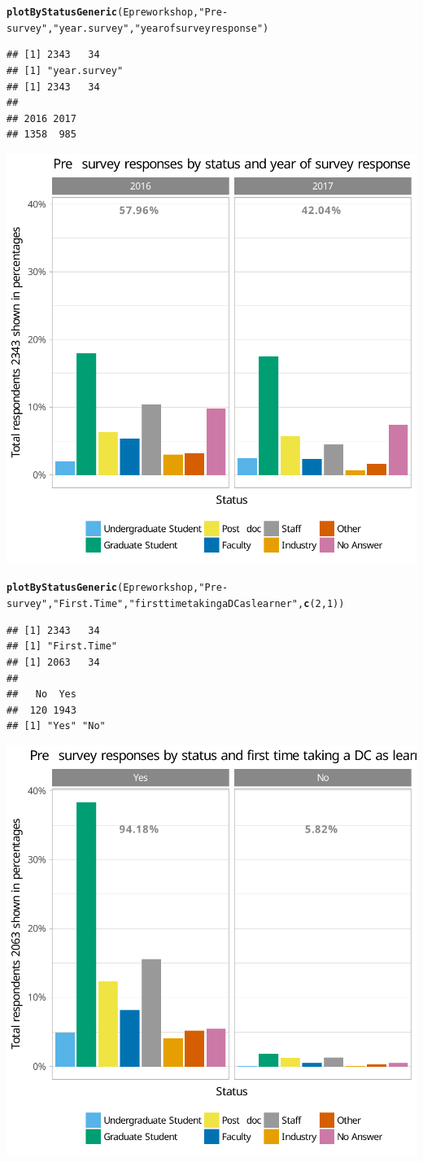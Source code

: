 \documentclass{article}\usepackage[]{graphicx}\usepackage[]{color}
\makeatletter
\newcommand{\hlnum}[1]{\textcolor[rgb]{0.686,0.059,0.569}{#1}}%
\newcommand{\hlstr}[1]{\textcolor[rgb]{0.192,0.494,0.8}{#1}}%
\newcommand{\hlstd}[1]{\textcolor[rgb]{0.345,0.345,0.345}{#1}}%
\newcommand{\hlkwd}[1]{\textcolor[rgb]{0.737,0.353,0.396}{\textbf{#1}}}%
\newenvironment{kframe}{%
 \def\at@end@of@kframe{}%
 \ifinner\ifhmode%
  \def\at@end@of@kframe{\end{minipage}}%
  \begin{minipage}{\columnwidth}%
 \fi\fi%
 \def\FrameCommand##1{\hskip\@totalleftmargin \hskip-\fboxsep
 \colorbox{shadecolor}{##1}\hskip-\fboxsep
     \hskip-\linewidth \hskip-\@totalleftmargin \hskip\columnwidth}%
 \MakeFramed {\advance\hsize-\width
   \@totalleftmargin\z@ \linewidth\hsize
   \@setminipage}}%
 {\par\unskip\endMakeFramed%
 \at@end@of@kframe}
\newenvironment{knitrout}{}{} %
\makeatother
\begin{document}
\begin{knitrout}
\color{fgcolor}\begin{kframe}
\begin{alltt}
\hlkwd{plotByStatusGeneric}\hlstd{(Epreworkshop,} \hlstr{"Pre-survey"}\hlstd{,} \hlstr{"year.survey"} \hlstd{,} \hlstr{"year of survey response"}\hlstd{)}
\end{alltt}
\begin{verbatim}
## [1] 2343   34
## [1] "year.survey"
## [1] 2343   34
## 
## 2016 2017 
## 1358  985
\end{verbatim}
\end{kframe}

{\centering \includegraphics[width=.6\linewidth]{figure/calls-Rnwplotting-presurvey-data-1} 

}


\begin{kframe}\begin{alltt}
\hlkwd{plotByStatusGeneric}\hlstd{(Epreworkshop,} \hlstr{"Pre-survey"}\hlstd{,} \hlstr{"First.Time"} \hlstd{,} \hlstr{"first time taking a DC as learner"}\hlstd{,} \hlkwd{c}\hlstd{(}\hlnum{2}\hlstd{,}\hlnum{1}\hlstd{))}
\end{alltt}
\begin{verbatim}
## [1] 2343   34
## [1] "First.Time"
## [1] 2063   34
## 
##   No  Yes 
##  120 1943 
## [1] "Yes" "No"
\end{verbatim}
\end{kframe}

{\centering \includegraphics[width=.6\linewidth]{figure/calls-Rnwplotting-presurvey-data-2} 

}
\end{knitrout}
\end{document}
